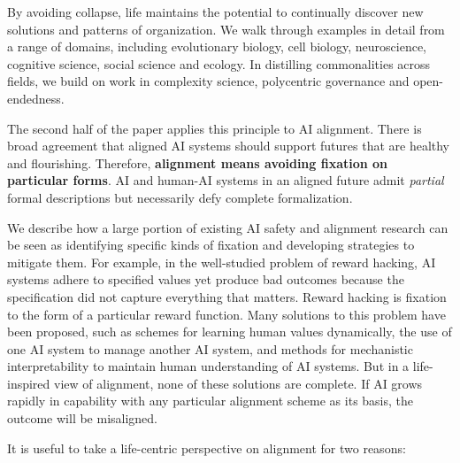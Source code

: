 \documentclass[fontsize=10.95pt]{scrartcl}
\begin{document}
By avoiding collapse, life maintains the potential to continually discover new solutions and patterns of organization. We walk through examples in detail from a range of domains, including evolutionary biology, cell biology, neuroscience, cognitive science, social science and ecology. In distilling commonalities across fields, we build on work in complexity science, polycentric governance and open-endedness.

The second half of the paper applies this principle to AI alignment. There is broad agreement that aligned AI systems should support futures that are healthy and flourishing. Therefore, \textbf{alignment means avoiding fixation on particular forms}. AI and human-AI systems in an aligned future admit \emph{partial} formal descriptions but necessarily defy complete formalization.

We describe how a large portion of existing AI safety and alignment research can be seen as identifying specific kinds of fixation and developing strategies to mitigate them. For example, in the well-studied problem of reward hacking, AI systems adhere to specified values yet produce bad outcomes because the specification did not capture everything that matters. Reward hacking is fixation to the form of a particular reward function. Many solutions to this problem have been proposed, such as schemes for learning human values dynamically, the use of one AI system to manage another AI system, and methods for mechanistic interpretability to maintain human understanding of AI systems. But in a life-inspired view of alignment, none of these solutions are complete. If AI grows rapidly in capability with any particular alignment scheme as its basis, the outcome will be misaligned. 

It is useful to take a life-centric perspective on alignment for two reasons:
\end{document}
